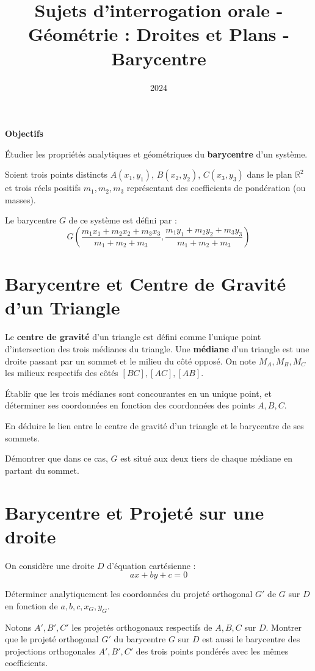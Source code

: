 \documentclass[10pt,a4paper]{article}
\title{Sujets d'interrogation orale - Géométrie : Droites et Plans - Barycentre}
\author{}
\date{2024}
\begin{document}
\textbf{Objectifs}

Étudier les propriétés analytiques et géométriques du \textbf{barycentre} d'un système.

Soient trois points distincts $A(x_1, y_1)$, $B(x_2, y_2)$, $C(x_3, y_3)$ dans le plan
$\mathbb{R}^2$ et trois réels positifs $m_1, m_2, m_3$ représentant des coefficients de pondération
(ou masses).

Le barycentre $G$ de ce système est défini par :
$$
G \left( \frac{m_1 x_1 + m_2 x_2 + m_3 x_3}{m_1 + m_2 + m_3},
         \frac{m_1 y_1 + m_2 y_2 + m_3 y_3}{m_1 + m_2 + m_3} \right)
$$


\section{Barycentre et Centre de Gravité d'un Triangle}


Le \textbf{centre de gravité} d'un triangle est défini comme l'unique point d'intersection des trois
médianes du triangle.
Une \textbf{médiane} d'un triangle est une droite passant par un sommet et le milieu du côté
opposé. On note $M_A, M_B, M_C$ les milieux respectifs des côtés $[BC], [AC], [AB]$.

\q Établir que les trois médianes sont concourantes en un unique point, et déterminer ses
coordonnées en fonction des coordonnées des points $A, B, C$.

\q En déduire le lien entre le centre de gravité d'un triangle et le barycentre de ses sommets.

\q Démontrer que dans ce cas, $G$ est situé aux deux tiers de chaque médiane en partant du sommet.


\section{Barycentre et Projeté sur une droite}

On considère une droite $D$ d'équation cartésienne :
$$ax + by + c = 0$$

\q Déterminer analytiquement les coordonnées du projeté orthogonal $G'$ de $G$ sur $D$ en fonction
de $a, b, c, x_G, y_G$.

\q Notons $A', B', C'$ les projetés orthogonaux respectifs de $A, B, C$ sur $D$. Montrer que le
projeté orthogonal $G'$ du barycentre $G$ sur $D$ est aussi le barycentre des projections
orthogonales $A', B', C'$ des trois points pondérés avec les mêmes coefficients.
\end{document}
